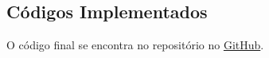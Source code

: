\documentclass[doutorado, pos-defesa]{packages/icmc}
\begin{document}
% 


% 

\postextual




% 


\begin{apendicesenv}
    \chapter{Códigos Implementados}
    O código final se encontra no repositório no \href{https://github.com/joaomh/study_boosting_optuna_USP_undergraduate_thesis}{GitHub}.


    

\end{apendicesenv}
\end{document}
